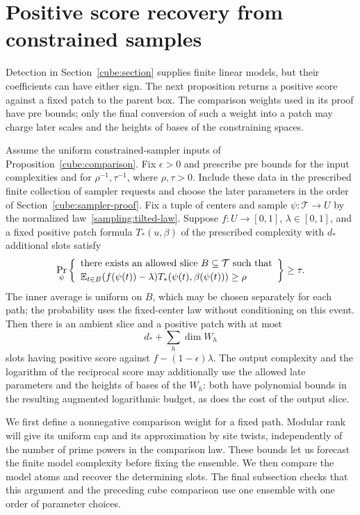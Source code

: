 \section{Positive score recovery from constrained samples}
\label{cube:transfer-section}

Detection in Section~\ref{cube:section} supplies finite linear models,
but their coefficients can have either sign. The next proposition
returns a positive score against a fixed patch to the parent box.
The comparison weights used in its proof have pre bounds; only the
final conversion of such a weight into a patch may charge later
scales and the heights of bases of the constraining spaces.

\begin{proposition}
\label{cube:conditioned-transfer}
Assume the uniform constrained-sampler inputs of
Proposition~\ref{cube:comparison}.  Fix $\epsilon>0$ and prescribe
pre bounds for the input complexities and for $\rho^{-1},\tau^{-1}$,
where $\rho,\tau>0$.  Include these data in the prescribed finite
collection of sampler requests and choose the later parameters in
the order of Section~\ref{cube:sampler-proof}.
Fix a tuple of centers and sample $\psi:\mathcal T\to U$ by the
normalized law~\eqref{sampling:tilted-law}.  Suppose
$f:U\to[0,1]$, $\lambda\in[0,1]$, and a fixed positive patch formula
$T_*(u,\beta)$ of the prescribed complexity with $d_*$ additional
slots satisfy
\[
 \Pr_\psi\left\{
 \begin{array}{l}
 \text{there exists an allowed slice }B\subseteq\mathcal T
 \text{ such that}\\[2pt]
 \displaystyle
 \mathbb E_{t\in B}(f(\psi(t))-\lambda)
       T_*(\psi(t),\beta(\psi(t)))\ge\rho
 \end{array}\right\}\ge\tau.
\]
The inner average is uniform on $B$, which may be chosen separately
for each path; the probability uses the fixed-center law without
conditioning on this event.  Then there is an ambient slice and a
positive patch with at most
\[
                         d_*+\sum_h\dim W_h
\]
slots having positive score against $f-(1-\epsilon)\lambda$.
The output complexity and the logarithm of the reciprocal score may
additionally use the allowed late parameters and the heights of bases
of the $W_h$: both have polynomial bounds in the resulting augmented
logarithmic budget, as does the cost of the output slice.
\end{proposition}

We first define a nonnegative comparison weight for a fixed path.
Modular rank will give its uniform cap and its approximation by
site twists, independently of the number of prime powers in the
comparison law. These bounds let us forecast the finite model
complexity before fixing the ensemble. We then compare the model
atoms and recover the determining slots. The final subsection
checks that this argument and the preceding cube comparison use
one ensemble with one order of parameter choices.


